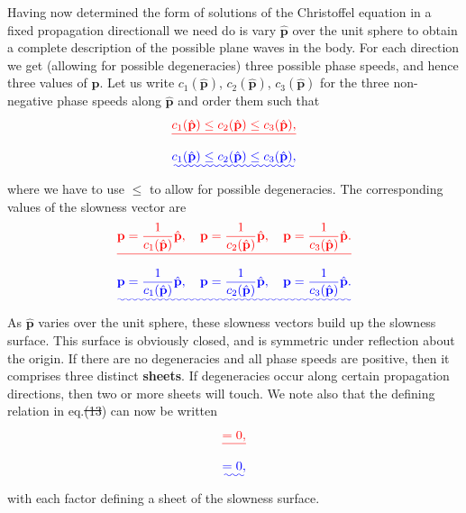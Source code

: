 \documentclass [a4paper,12pt]{paper}
\providecommand{\DIFadd}[1]{{\protect\color{blue}\uwave{#1}}} %
\providecommand{\DIFdel}[1]{{\protect\color{red}\sout{#1}}}                      %
\providecommand{\DIFaddbegin}{} %
\providecommand{\DIFaddend}{} %
\providecommand{\DIFdelbegin}{} %
\providecommand{\DIFdelend}{} %
\begin{document}
Having now determined the form of solutions of the Christoffel equation in a fixed propagation direction\DIFaddbegin \DIFadd{, }\DIFaddend all we need do is vary $\hat{\mathbf{p}}$ over the unit sphere to obtain a complete description 
of the possible plane waves in the body. For each direction we get (allowing for possible degeneracies) three possible phase speeds, and hence three values of $\mathbf{p}$. Let us write $c_{1}(\hat{\mathbf{p}})$,
 $c_{2}(\hat{\mathbf{p}})$, $c_{3}(\hat{\mathbf{p}})$ for the three non-negative phase speeds along $\hat{\mathbf{p}}$ and order them such that
\DIFdelbegin \begin{displaymath}
\DIFdel{c_{1}(\hat{\mathbf{p}})\le c_{2}(\hat{\mathbf{p}})\le c_{3}(\hat{\mathbf{p}}),
}\end{displaymath}%
\DIFdelend \DIFaddbegin \begin{equation}
\DIFadd{c_{1}(\hat{\mathbf{p}})\le c_{2}(\hat{\mathbf{p}})\le c_{3}(\hat{\mathbf{p}}),
\label{eq:18}
}\end{equation}\DIFaddend 
where we have to use $\le$ to allow for possible degeneracies. The corresponding values of the slowness vector are
\DIFdelbegin \begin{displaymath}
\DIFdel{\mathbf{p}=\frac{1}{c_{1}(\hat{\mathbf{p}})}\hat{\mathbf{p}}, \quad \mathbf{p}=\frac{1}{c_{2}(\hat{\mathbf{p}})}\hat{\mathbf{p}}, \quad \mathbf{p}=\frac{1}{c_{3}(\hat{\mathbf{p}})}\hat{\mathbf{p}}.
}\end{displaymath}%
\DIFdelend \DIFaddbegin \begin{equation}
\DIFadd{\mathbf{p}=\frac{1}{c_{1}(\hat{\mathbf{p}})}\hat{\mathbf{p}}, \quad \mathbf{p}=\frac{1}{c_{2}(\hat{\mathbf{p}})}\hat{\mathbf{p}}, \quad \mathbf{p}=\frac{1}{c_{3}(\hat{\mathbf{p}})}\hat{\mathbf{p}}.
\label{eq:19}
}\end{equation}\DIFaddend 
As $\hat{\mathbf{p}}$ varies over the unit sphere, these slowness vectors build up the slowness surface. This surface is obviously closed, and is symmetric under reflection about the origin. If there are 
no degeneracies and all phase speeds are positive, then it comprises three distinct \textbf{sheets}. If degeneracies occur along certain propagation directions, then two or more sheets will touch. 
We note also that the defining relation in eq.\DIFdelbegin \DIFdel{(13}\DIFdelend \DIFaddbegin \DIFadd{~(\ref{eq:13}}\DIFaddend ) can now be written
\DIFdelbegin \begin{displaymath}
[\DIFdel{||\mathbf{p}||^{2}c_{1}(\hat{\mathbf{p}})^{2}-1}][\DIFdel{||\mathbf{p}||^{2}c_{2}(\hat{\mathbf{p}})^{2}-1}][\DIFdel{||\mathbf{p}||^{2}c_{3}(\hat{\mathbf{p}})^{2}-1}]\DIFdel{=0,
}\end{displaymath}%
\DIFdelend \DIFaddbegin \begin{equation}
[\DIFadd{\|\mathbf{p}\|^{2}c_{1}(\hat{\mathbf{p}})^{2}-1}][\DIFadd{\|\mathbf{p}\|^{2}c_{2}(\hat{\mathbf{p}})^{2}-1}][\DIFadd{\|\mathbf{p}\|^{2}c_{3}(\hat{\mathbf{p}})^{2}-1}]\DIFadd{=0,
\label{eq:20}
}\end{equation}\DIFaddend 
with each factor defining a sheet of the slowness surface.
\end{document}
